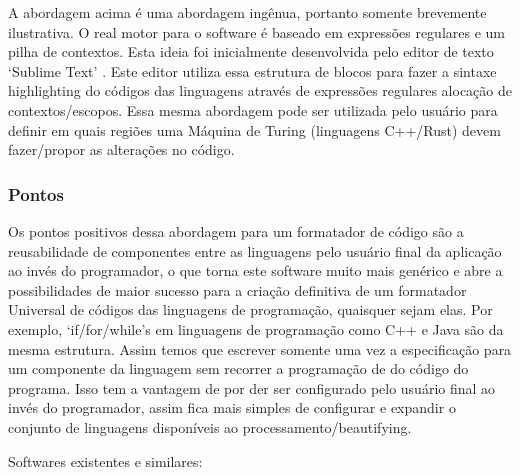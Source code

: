     A abordagem acima é uma abordagem ingênua, portanto somente brevemente ilustrativa. O real motor
    para o software é baseado em expressões regulares e um pilha de contextos. Esta ideia foi
    inicialmente desenvolvida pelo editor de texto `Sublime Text' \cite{Skinner}. Este editor
    utiliza essa estrutura de blocos para fazer a sintaxe highlighting do códigos das linguagens
    através de expressões regulares alocação de contextos/escopos. Essa mesma abordagem pode ser
    utilizada pelo usuário para definir em quais regiões uma Máquina de Turing (linguagens C++/Rust)
    devem fazer/propor as alterações no código.


\subsubsection{Pontos}

    Os pontos positivos dessa abordagem para um formatador de código são a reusabilidade de
    componentes entre as linguagens pelo usuário final da aplicação ao invés do programador, o que
    torna este software muito mais genérico e abre a possibilidades de maior sucesso para a criação
    definitiva de um formatador Universal de códigos das linguagens de programação, quaisquer sejam
    elas. Por exemplo, `if/for/while'\textquotesingle s em linguagens de programação como C++ e Java
    são da mesma estrutura. Assim temos que escrever somente uma vez a especificação para um
    componente da linguagem sem recorrer a programação de do código do programa. Isso tem a vantagem
    de por der ser configurado pelo usuário final ao invés do programador, assim fica mais simples
    de configurar e expandir o conjunto de linguagens disponíveis ao processamento/beautifying.

    Softwares existentes e similares:

